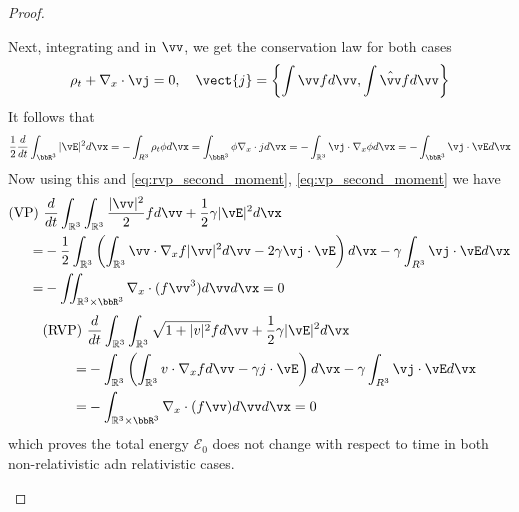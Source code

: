 \begin{proof}
\begin{enumerate}[(a)]
      Next, integrating \eqvp and \eqrvp in $\vv$, we get the conservation law for both cases
      \[
      \rho_{t}+\nabla_{x} \cdot \vj=0, \quad \vect{j}=\left\{\int \vv f d \vv, \int \hat{\vv} f d \vv\right\}
      \]
      It follows that
      \[
      \frac{1}{2} \frac{d}{d t} \int_{\bbR^{3}}|\vE|^{2} d \vx=-\int_{R^{3}} \rho_{t} \phi d \vx=\int_{\bbR^{3}} \phi \nabla_{x} \cdot j d \vx=-\int_{\mathbb{R}^{3}} \vj \cdot \nabla_{x} \phi d \vx=-\int_{\bbR^{3}} \vj \cdot \vE d \vx
      \]
      Now using this and \eqref{eq:rvp_second_moment}, \eqref{eq:vp_second_moment} we have
      \[
      \begin{aligned}
      \text{(VP) }&\frac{d}{d t} \int_{\mathbb{R}^{3}}\int_{\mathbb{R}^{3}} \frac{|\vv|^{2}}{2} f d \vv+\frac{1}{2} \gamma|\vE|^{2} d \vx\\ =&-\frac{1}{2} \int_{\mathbb{R}^{3}}\left(\int_{\mathbb{R}^{3}} \vv \cdot \nabla_{x}   f  |\vv|^2 d \vv-2\gamma \vj \cdot \vE\right) d \vx-\gamma \int_{R^{3}} \vj \cdot \vE d \vx \\
      =&-\iint_{\mathbb{R}^{3}\times \bbR^{3}} \nabla_{x} \cdot(f \vv^3) d \vv d \vx=0
      \end{aligned}
      \]
      \[
      \begin{aligned}
        \text{(RVP) }&\frac{d}{d t} \int_{\mathbb{R}^{3}}\int_{\mathbb{R}^{3}} \sqrt{1+|v|^{2}} f d \vv+\frac{1}{2} \gamma|\vE|^{2} d \vx\\ =&-\int_{\mathbb{R}^{3}}\left(\int_{\mathbb{R}^{3}} v \cdot \nabla_{x} f d \vv-\gamma j \cdot \vE\right) d \vx-\gamma \int_{R^{3}} \vj \cdot \vE d \vx \\
        =&-\int_{\mathbb{R}^{3}\times \bbR^{3}} \nabla_{x} \cdot(f \vv) d \vv d \vx=0
        \end{aligned}
      \]
      which proves the total energy $\mathcal{E}_0$ does not change with respect to time in both non-relativistic adn relativistic cases.

    \end{enumerate}

\end{proof}
